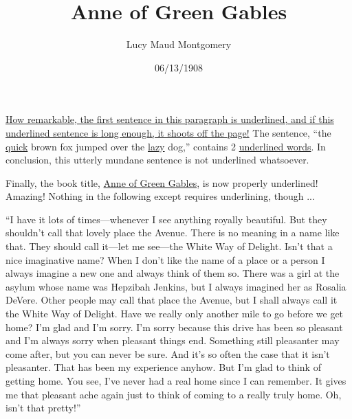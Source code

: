 \documentclass[a4paper]{article}
\title{Anne of Green Gables}
\author{Lucy Maud Montgomery}
\date{06/13/1908}
\begin{document}
\maketitle

\underline{How remarkable, the first sentence in this paragraph is underlined, and if this underlined sentence is long enough, it shoots off the page!} The sentence, ``the \underline{quick} brown fox jumped over the \underline{lazy} dog,'' contains 2 \underline{underlined words}. In conclusion, this utterly mundane sentence is not underlined whatsoever.

Finally, the book title, \underline{Anne of Green Gables}, is now properly underlined! Amazing! Nothing in the following except requires underlining, though ...

``I have it lots of times---whenever I see anything royally beautiful. But they shouldn't call that lovely place the Avenue. There is no meaning in a name like that. They should call it---let me see---the White Way of Delight. Isn't that a nice imaginative name? When I don't like the name of a place or a person I always imagine a new one and always think of them so. There was a girl at the asylum whose name was Hepzibah Jenkins, but I always imagined her as Rosalia DeVere. Other people may call that place the Avenue, but I shall always call it the White Way of Delight. Have we really only another mile to go before we get home? I'm glad and I'm sorry. I'm sorry because this drive has been so pleasant and I'm always sorry when pleasant things end. Something still pleasanter may come after, but you can never be sure. And it's so often the case that it isn't pleasanter. That has been my experience anyhow. But I'm glad to think of getting home. You see, I've never had a real home since I can remember. It gives me that pleasant ache again just to think of coming to a really truly home. Oh, isn't that pretty!''
\end{document}
